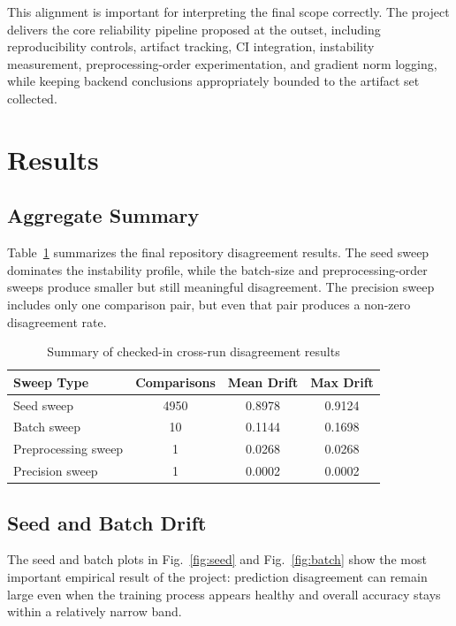 \documentclass[conference]{IEEEtran}
\begin{document}
This alignment is important for interpreting the final scope correctly. The project delivers the core reliability pipeline proposed at the outset, including reproducibility controls, artifact tracking, CI integration, instability measurement, preprocessing-order experimentation, and gradient norm logging, while keeping backend conclusions appropriately bounded to the artifact set collected.

\section{Results}

\subsection{Aggregate Summary}

Table~\ref{tab:summary} summarizes the final repository disagreement results. The seed sweep dominates the instability profile, while the batch-size and preprocessing-order sweeps produce smaller but still meaningful disagreement. The precision sweep includes only one comparison pair, but even that pair produces a non-zero disagreement rate.

\begin{table}[t]
\centering
\caption{Summary of checked-in cross-run disagreement results}
\label{tab:summary}
\begin{tabular}{lccc}
\toprule
Sweep Type & Comparisons & Mean Drift & Max Drift \\
\midrule
Seed sweep & 4950 & 0.8978 & 0.9124 \\
Batch sweep & 10 & 0.1144 & 0.1698 \\
Preprocessing sweep & 1 & 0.0268 & 0.0268 \\
Precision sweep & 1 & 0.0002 & 0.0002 \\
\bottomrule
\end{tabular}
\end{table}

\subsection{Seed and Batch Drift}

The seed and batch plots in Fig.~\ref{fig:seed} and Fig.~\ref{fig:batch} show the most important empirical result of the project: prediction disagreement can remain large even when the training process appears healthy and overall accuracy stays within a relatively narrow band.
\end{document}
